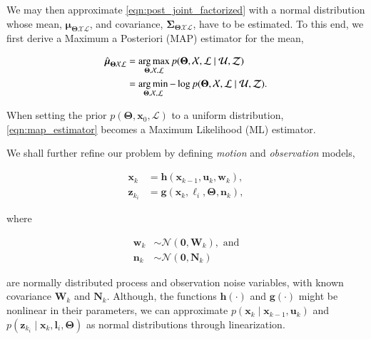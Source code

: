 \noindent We may then approximate \eqref{eqn:post_joint_factorized} with a
normal distribution whose mean, $\boldsymbol{\mu}_{\boldsymbol{\Theta}
\mathcal{X}\mathcal{L}}$, and covariance, $\boldsymbol{\Sigma}_
{\boldsymbol{\Theta}\mathcal{X}\mathcal{L}}$, have to be estimated. To this end,
we first derive a Maximum a Posteriori (MAP) estimator for the mean,

\begin{equation}\label{eqn:map_estimator}
  \begin{aligned}
  \hat{\boldsymbol{\mu}}_{\boldsymbol{\Theta}\mathcal{X}\mathcal{L}} &=
    \operatorname*{arg\,max}_{\boldsymbol{\Theta},\mathcal{X},\mathcal{L}}
    p(\boldsymbol{\Theta}, \mathcal{X},\mathcal{L} \mid\mathcal{U},\mathcal{Z})
    \\
    &= \operatorname*{arg\,min}_{\boldsymbol{\Theta},\mathcal{X},\mathcal{L}}-\log
    p(\boldsymbol{\Theta}, \mathcal{X},\mathcal{L} \mid\mathcal{U},\mathcal{Z}).
  \end{aligned}
\end{equation}

\noindent When setting the prior $p(\boldsymbol{\Theta}, \mathbf{x}_0,
\mathcal{L})$ to a uniform distribution, \eqref{eqn:map_estimator} becomes a
Maximum Likelihood (ML) estimator.

We shall further refine our problem by defining \emph{motion} and
\emph{observation} models,

\begin{equation}\label{eqn:process_model}
  \begin{aligned}
  \mathbf{x}_k &= \mathbf{h}(\mathbf{x}_{k-1}, \mathbf{u}_k, \mathbf{w}_k),\\
  \mathbf{z}_{k_i} &= \mathbf{g}(\mathbf{x}_{k}, \boldsymbol{\ell}_i,
    \boldsymbol{\Theta}, \mathbf{n}_k),
  \end{aligned}
\end{equation}

\noindent where

\begin{equation}\label{eqn:noise_model}
  \begin{aligned}
  \mathbf{w}_k &\sim \mathcal{N}(\mathbf{0},\mathbf{W}_k),\text{ and}\\
  \mathbf{n}_k &\sim \mathcal{N}(\mathbf{0},\mathbf{N}_k)
  \end{aligned}
\end{equation}

\noindent are normally distributed process and observation noise variables,
with known covariance $\mathbf{W}_k$ and $\mathbf{N}_k$. Although, the
functions $\mathbf{h}(\cdot)$ and $\mathbf{g}(\cdot)$ might be nonlinear in
their parameters, we can approximate
$p(\mathbf{x}_k\mid\mathbf{x}_{k - 1},\mathbf{u}_k)$ and
$p(\mathbf{z}_{k_i}\mid\mathbf{x}_k, \mathbf{l}_i,\boldsymbol{\Theta})$ as
normal distributions through linearization.

